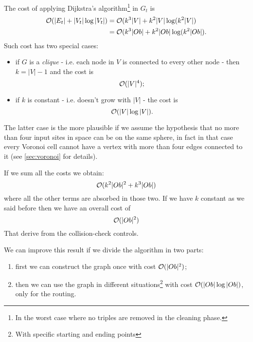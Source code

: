 \documentclass[dissertation.tex]{subfiles}
\begin{document}
The cost of applying Dijkstra's algorithm\footnote{In the worst case
  where no triples are removed in the cleaning phase.} in $G_t$ is \cite{bondy}\cite{lavalle}
\newcommand{\eqCostDijkstraTriples}{\ensuremath{\bigO(k^3|Ob|+k^2|Ob|\log(k^2|Ob|)}}
\begin{equation}
  \label{eq:costDijkstraTriples}
  \begin{split}
    \bigO(|E_t|+|V_t|\log |V_t|) &= \bigO(k^3|V|+k^2|V|\log(k^2|V|)\\
    &= \eqCostDijkstraTriples.
  \end{split}
\end{equation}
Such cost has two special cases:
\begin{itemize}
\item if $G$ is a \emph{clique} - i.e. each
  node in $V$ is connected to every other node \cite{bondy} - then
  $k=|V|-1$ and the cost is
  \begin{equation*}
    \mathcal{O}(|V|^4);
  \end{equation*}
\item if $k$ is constant - i.e. doesn't grow with $|V|$ - the
  cost is
  \begin{equation*}
    \mathcal{O}(|V|\log|V|).
  \end{equation*}
\end{itemize}
The latter case is the more plausible if we assume the hypothesis that
no more than four input sites in space can be on the
same sphere, in fact in that case
every Voronoi cell cannot have a vertex with more than four edges
connected to it (see \cref{sec:voronoi} for details).

If we sum all the costs we obtain:
\newcommand{\eqCostTotalOne}{\ensuremath{\bigO(k^2|Ob|^2+k^3|Ob|)}}
\begin{equation}\label{eq:costTotalOne}
  \eqCostTotalOne
\end{equation}
where all the other terms are absorbed in those two. If we have $k$
constant as we said before then we have an overall cost of
\newcommand{\eqCostTotalOneK}{\ensuremath{\bigO(|Ob|^2)}}
\begin{equation}\label{eq:costTotalOneK}
  \eqCostTotalOneK
\end{equation}
That derive from the collision-check controls.

We can improve
this result if we divide the algorithm in two parts:
\begin{enumerate}
\item first we 
  can construct the graph once with cost $\mathcal{O}(|Ob|^2)$;
\item then we can
  use the graph in different situations\footnote{With specific starting
    and ending points} with cost $\mathcal{O}(|Ob|\log |Ob|)$, only for the
  routing.
\end{enumerate}
\end{document}
